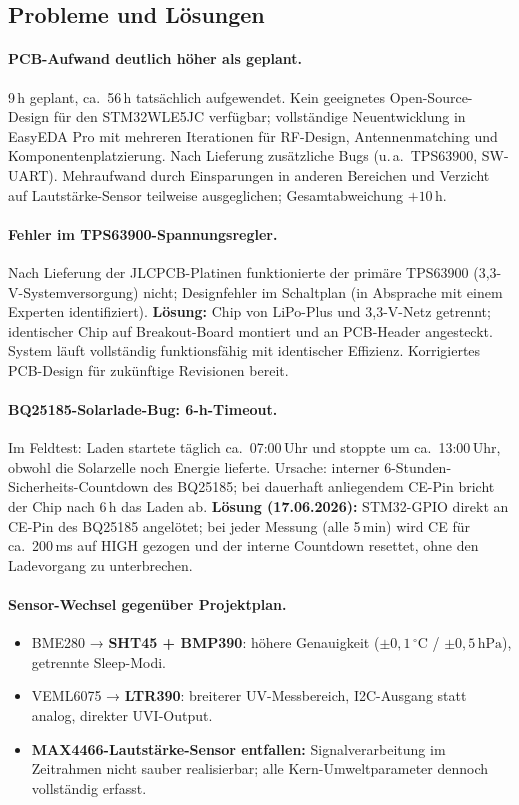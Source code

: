 \documentclass[11pt,a4paper]{scrartcl}
\begin{document}
\subsection*{Probleme und Lösungen}

\paragraph{PCB-Aufwand deutlich höher als geplant.}
9\,h geplant, ca.~56\,h tatsächlich aufgewendet. Kein geeignetes Open-Source-Design für den STM32WLE5JC verfügbar; vollständige Neuentwicklung in EasyEDA Pro mit mehreren Iterationen für RF-Design, Antennenmatching und Komponentenplatzierung. Nach Lieferung zusätzliche Bugs (u.\,a.\ TPS63900, SW-UART). Mehraufwand durch Einsparungen in anderen Bereichen und Verzicht auf Lautstärke-Sensor teilweise ausgeglichen; Gesamtabweichung $+10\,\text{h}$.

\paragraph{Fehler im TPS63900-Spannungsregler.}
Nach Lieferung der JLCPCB-Platinen funktionierte der primäre TPS63900 (3,3-V-Systemversorgung) nicht; Designfehler im Schaltplan (in Absprache mit einem Experten identifiziert). \textbf{Lösung:} Chip von LiPo-Plus und 3,3-V-Netz getrennt; identischer Chip auf Breakout-Board montiert und an PCB-Header angesteckt. System läuft vollständig funktionsfähig mit identischer Effizienz. Korrigiertes PCB-Design für zukünftige Revisionen bereit.

\paragraph{BQ25185-Solarlade-Bug: 6-h-Timeout.}
Im Feldtest: Laden startete täglich ca.~07:00\,Uhr und stoppte um ca.~13:00\,Uhr, obwohl die Solarzelle noch Energie lieferte. Ursache: interner 6-Stunden-Sicherheits-Countdown des BQ25185; bei dauerhaft anliegendem CE-Pin bricht der Chip nach 6\,h das Laden ab. \textbf{Lösung (17.06.2026):} STM32-GPIO direkt an CE-Pin des BQ25185 angelötet; bei jeder Messung (alle 5\,min) wird CE für ca.~200\,ms auf HIGH gezogen und der interne Countdown resettet, ohne den Ladevorgang zu unterbrechen.

\paragraph{Sensor-Wechsel gegenüber Projektplan.}
\begin{itemize}
  \item BME280 → \textbf{SHT45 + BMP390}: höhere Genauigkeit ($\pm0{,}1\,^\circ$C / $\pm0{,}5\,\text{hPa}$), getrennte Sleep-Modi.
  \item VEML6075 → \textbf{LTR390}: breiterer UV-Messbereich, I2C-Ausgang statt analog, direkter UVI-Output.
  \item \textbf{MAX4466-Lautstärke-Sensor entfallen:} Signalverarbeitung im Zeitrahmen nicht sauber realisierbar; alle Kern-Umweltparameter dennoch vollständig erfasst.
\end{itemize}
\end{document}
